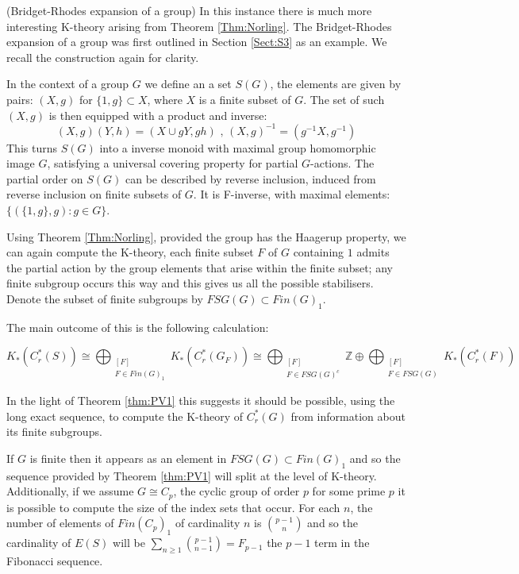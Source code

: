 \begin{example}(Bridget-Rhodes expansion of a group)
In this instance there is much more interesting K-theory arising from Theorem \ref{Thm:Norling}. The Bridget-Rhodes expansion of a group \cite{MR745358,MR2221438} was first outlined in Section \ref{Sect:S3} as an example. We recall the construction again for clarity.

In the context of a group $G$ we define an a set $S(G)$, the elements are given by pairs: $(X,g)$ for $\lbrace 1,g\rbrace \subset X$, where $X$ is a finite subset of $G$. The set of such $(X,g)$ is then equipped with a product and inverse:
\begin{equation*}
(X,g)(Y,h) = (X\cup gY,gh)\mbox{ , } (X,g)^{-1}=(g^{-1}X,g^{-1})
\end{equation*}
This turns $S(G)$ into a inverse monoid with maximal group homomorphic image $G$, satisfying a universal covering property for partial $G$-actions. The partial order on $S(G)$ can be described by reverse inclusion, induced from reverse inclusion on finite subsets of $G$. It is F-inverse, with maximal elements: $\lbrace(\lbrace 1,g \rbrace, g):g \in G \rbrace$. 

Using Theorem \ref{Thm:Norling}, provided the group has the Haagerup property, we can again compute the K-theory, each finite subset $F$ of $G$ containing $1$ admits the partial action by the group elements that arise within the finite subset; any finite subgroup occurs this way and this gives us all the possible stabilisers. Denote the subset of finite subgroups by $FSG(G)\subset Fin(G)_{1}$. 

The main outcome of this is the following calculation:

\begin{equation*}
K_{*}(C^{*}_{r}(S)) \cong \bigoplus_{\substack{[F] \\ F \in Fin(G)_{1}}} K_{*}(C^{*}_{r}(G_{F})) \cong \bigoplus_{\substack{[F] \\F \in FSG(G)^{c}} }\mathbb{Z} \oplus \bigoplus_{\substack{[F] \\F \in FSG(G) }}K_{*}(C^{*}_{r}(F))
\end{equation*}

In the light of Theorem \ref{thm:PV1} this suggests it should be possible, using the long exact sequence, to compute the K-theory of $C^{*}_{r}(G)$ from information about its finite subgroups.

If $G$ is finite then it appears as an element in $FSG(G) \subset Fin(G)_{1}$ and so the sequence provided by Theorem \ref{thm:PV1} will split at the level of K-theory. Additionally, if we assume $G \cong C_{p}$, the cyclic group of order $p$ for some prime $p$ it is possible to compute the size of the index sets that occur. For each $n$, the number of elements of $Fin(C_{p})_{1}$ of cardinality $n$ is ${p-1 \choose n}$ and so the cardinality of $E(S)$ will be $\sum_{n\geq 1} {p-1 \choose n-1} = F_{p-1}$ the $p-1$ term in the Fibonacci sequence. 


\end{example}
